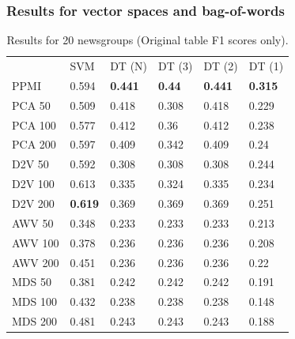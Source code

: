 \subsubsection{Results for vector spaces and bag-of-words}
\begin{table}[]
	\begin{tabular}{llllll}
		& SVM   & DT (N) & DT (3) & DT (2) & DT (1) \\
		PPMI           & 0.594 & \textbf{0.441}  & \textbf{0.44}   & \textbf{0.441}  & \textbf{0.315}  \\
		PCA 50         & 0.509 & 0.418  & 0.308  & 0.418  & 0.229  \\
		PCA 100        & 0.577 & 0.412  & 0.36   & 0.412  & 0.238  \\
		PCA 200        & 0.597 & 0.409  & 0.342  & 0.409  & 0.24   \\
		D2V 50         & 0.592 & 0.308  & 0.308  & 0.308  & 0.244  \\
		D2V 100        & 0.613 & 0.335  & 0.324  & 0.335  & 0.234  \\
		D2V 200        & \textbf{0.619} & 0.369  & 0.369  & 0.369  & 0.251  \\
		AWV 50         & 0.348 & 0.233  & 0.233  & 0.233  & 0.213  \\
		AWV 100        & 0.378 & 0.236  & 0.236  & 0.236  & 0.208  \\
		AWV 200        & 0.451 & 0.236  & 0.236  & 0.236  & 0.22   \\
		MDS 50         & 0.381 & 0.242  & 0.242  & 0.242  & 0.191  \\
		MDS 100        & 0.432 & 0.238  & 0.238  & 0.238  & 0.148  \\
		MDS 200        & 0.481 & 0.243  & 0.243  & 0.243  & 0.188 
	\end{tabular}
	\caption{Results for 20 newsgroups (Original table F1 scores only).}
	\label{table:Newsgroups}
\end{table}

